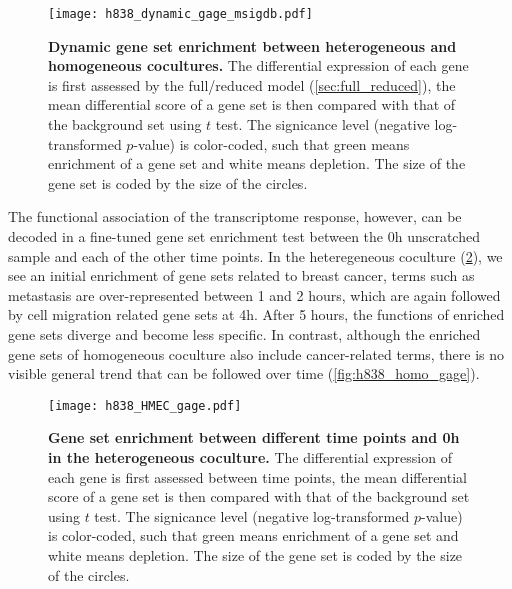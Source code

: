 \begin{figure}[!ht]
\begin{center}
\texttt{[image: h838\_dynamic\_gage\_msigdb.pdf]}
\end{center}
\caption[Dynamic gene set enrichment]{
{\bf Dynamic gene set enrichment between heterogeneous and homogeneous 
cocultures.} 
The differential expression of each gene is first assessed by the full/reduced
model (\ref{sec:full_reduced}), the mean differential score of a gene set
is then compared with that of the background set using $t$ test.
The signicance level (negative log-transformed $p$-value) is color-coded, such
that green means enrichment of a gene set and white means depletion. The size
of the gene set is coded by the size of the circles.
}
\label{fig:h838_dynamic_gage_msigdb}
\end{figure}

The functional association of the transcriptome response, however, can be
decoded in a fine-tuned gene set enrichment test between the 0h unscratched
sample and each of the other time points. In the heteregeneous coculture 
(\ref{fig:h838_hetero_gage}),
we see an initial enrichment of gene sets related to breast cancer, terms
such as metastasis are over-represented between 1 and 2 hours, which are
again followed by cell migration related gene sets at 4h. After 5 hours,
the functions of enriched gene sets diverge and become less specific.
In contrast, although the enriched gene sets of homogeneous coculture also 
include cancer-related terms, there is no visible general trend that can
be followed over time (\ref{fig:h838_homo_gage}). 

\begin{figure}[!ht]
\begin{center}
\texttt{[image: h838\_HMEC\_gage.pdf]}
\end{center}
\caption[Gene set enrichment of the heterogeneous coculture]{
{\bf Gene set enrichment between different time points and 0h in the heterogeneous 
coculture.} 
The differential expression of each gene is first assessed between time points, 
the mean differential score of a gene set
is then compared with that of the background set using $t$ test.
The signicance level (negative log-transformed $p$-value) is color-coded, such
that green means enrichment of a gene set and white means depletion. The size
of the gene set is coded by the size of the circles.
}
\label{fig:h838_hetero_gage}
\end{figure}

